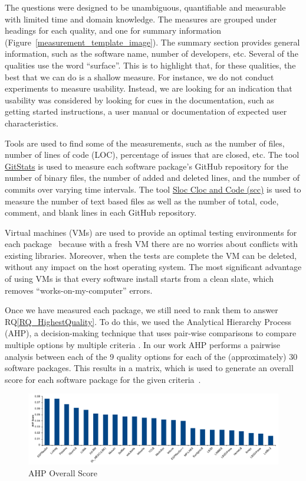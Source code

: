 \documentclass[runningheads]{llncs}
\newcommand{\rqref}[1]{RQ\ref{#1}}
\begin{document}
The questions were designed to be unambiguous, quantifiable and measurable with
limited time and domain knowledge. The measures are grouped under headings for
each quality, and one for summary information
(Figure~\ref{measurement_template_image}).   The summary section provides
general information, such as the software name, number of developers, etc.
Several of the qualities use the word ``surface''.  This is to highlight that,
for these qualities, the best that we can do is a shallow measure. For instance,
we do not conduct experiments to measure usability. Instead, we are looking for
an indication that usability was considered by looking for cues in the
documentation, such as getting started instructions, a user manual or
documentation of expected user characteristics.

Tools are used to find some of the measurements, such as the number of files,
number of lines of code (LOC), percentage of issues that are closed, etc. The
tool \href{https://github.com/tomgi/git_stats}{GitStats} is used to measure
each software package's GitHub repository for the number of binary files, the
number of added and deleted lines, and the number of commits over varying time
intervals. The tool \href{https://github.com/boyter/scc}{Sloc Cloc and Code
(scc)} is used to measure the number of text based files as well as the number
of total, code, comment, and blank lines in each GitHub repository.

Virtual machines (VMs) are used to provide an optimal testing environments for
each package~\cite{SmithEtAl2016} because with a fresh VM there are no worries
about conflicts with existing libraries. Moreover, when the tests are complete
the VM can be deleted, without any impact on the host operating system. The most
significant advantage of using VMs is that every software install starts from a
clean slate, which removes ``works-on-my-computer'' errors.

Once we have measured each package, we still need to rank them to answer
\rqref{RQ_HighestQuality}.  To do this, we used the Analytical Hierarchy Process
(AHP), a decision-making technique that uses pair-wise comparisons to
compare multiple options by multiple criteria \cite{Saaty1980}. In our work AHP
performs a pairwise analysis between each of the 9 quality options for each of
the (approximately) 30 software packages.  This results in a matrix, which is
used to generate an overall score for each software package for the given
criteria~\cite{SmithEtAl2016}.

\begin{figure}[h!]
	\centering
		\includegraphics[width=1.0\textwidth]{./figures/finalscore_chart.pdf}
		\caption{AHP Overall Score}
		\label{Fig_OverallScore}
\end{figure}
\end{document}
